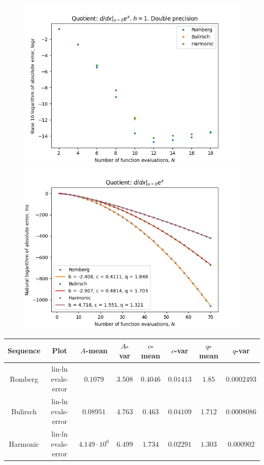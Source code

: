 \begin{figure}[H]
\centering
\begin{minipage}{0.45\textwidth}
\centering
\includegraphics[scale=0.45]{diff_quot_plots/exp_0.png}
\end{minipage}
\begin{minipage}{0.45\textwidth}
\centering
\includegraphics[scale=0.45]{diff_quot_plots/exp_0_hp_trend.png}
\end{minipage}
\end{figure}

\begin{table}[H]
    \centering
    \small
    \begin{tabular}{c|c||c|c|c|c|c|c}
Sequence & Plot & \(A\)-mean & \(A\)-var & \(c\)-mean & \(c\)-var & \(q\)-mean & \(q\)-var\\\hline
Romberg & lin-ln evals-error & \(0.1079\) & \(3.508\) & \(0.4046\) & \(0.01413\) & \(1.85\) & \(0.0002493\) \\
Bulirsch & lin-ln evals-error & \(0.08951\) & \(4.763\) & \(0.463\) & \(0.04109\) & \(1.712\) & \(0.0008086\) \\
Harmonic & lin-ln evals-error & \(4.149\cdot 10^{6}\) & \(6.499\) & \(1.734\) & \(0.02291\) & \(1.303\) & \(0.000902\) \\
    \end{tabular}
    \label{tab:my_label}
\end{table}

